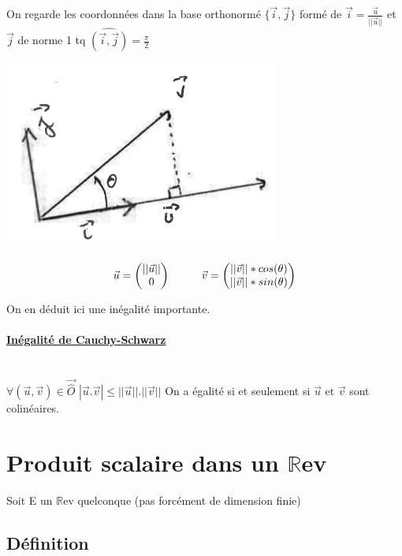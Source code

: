 \documentclass{article}
\newcommand\tab[1][1cm]{\hspace*{#1}}
\begin{document}
On regarde les coordonnées dans la base orthonormé $\{\vec{i},\vec{j}\}$ formé de $\vec{i} = \frac{\vec{u}}{||\vec{u}||}$ et $\vec{j}$ de norme 1 tq $\widehat{(\vec{i}, \vec{j})} = \frac{\pi}{2}$

\includegraphics{images/image07.png}

$$
\vec{u} = 
\begin{pmatrix}
    ||\vec{u}||\\
    0\\
\end{pmatrix}
\tab \vec{v} = 
\begin{pmatrix}
    ||\vec{v}|| * cos(\theta)\\
    ||\vec{v}|| * sin(\theta)\\
\end{pmatrix}
$$

On en déduit ici une inégalité importante.

\paragraph{\underline{Inégalité de Cauchy-Schwarz}} \mbox{}\\
$\forall (\vec{u}, \vec{v}) \in \overrightarrow{\widehat{O}}$
$|\vec{u}.\vec{v}| \leq ||\vec{u}||.||\vec{v}||$
On a égalité si et seulement si $\vec{u} \mbox{ et } \vec{v}$ sont colinéaires.

\section{Produit scalaire dans un $\mathbb{R}$ev}

Soit E un $\mathbb{R}$ev quelconque (pas forcément de dimension finie)

\subsection{Définition}
\end{document}
